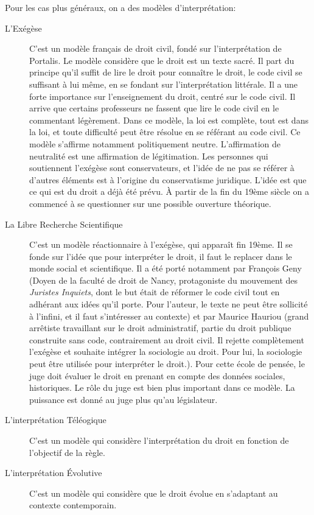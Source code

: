 \documentclass[math]{cours}
\begin{document}
Pour les cas plus généraux, on a des modèles d'interprétation:
\begin{description}
	\item[L'Exégèse] C'est un modèle français de droit civil, fondé sur l'interprétation de Portalis.
		Le modèle considère que le droit est un texte sacré.
		Il part du principe qu'il suffit de lire le droit pour connaître le droit, le code civil se suffisant à lui même, en se fondant sur l'interprétation littérale.
		Il a une forte importance sur l'enseignement du droit, centré sur le code civil.
		Il arrive que certains professeurs ne fassent que lire le code civil en le commentant légèrement.
		Dans ce modèle, la loi est complète, tout est dans la loi, et toute difficulté peut être résolue en se référant au code civil.
		Ce modèle s'affirme notamment politiquement neutre.
		L'affirmation de neutralité est une affirmation de légitimation.
		Les personnes qui soutiennent l'exégèse sont conservateurs, et l'idée de ne pas se référer à d'autres éléments est à l'origine du conservatisme juridique.
		L'idée est que ce qui est du droit a déjà été prévu.
		À partir de la fin du 19ème siècle on a commencé à se questionner sur une possible ouverture théorique.
	\item[La Libre Recherche Scientifique] C'est un modèle réactionnaire à l'exégèse, qui apparaît fin 19ème.
		Il se fonde sur l'idée que pour interpréter le droit, il faut le replacer dans le monde social et scientifique.
		Il a été porté notamment par François Geny (Doyen de la faculté de droit de Nancy, protagoniste du mouvement des \emph{Juristes Inquiets}, dont le but était de réformer le code civil tout en adhérant aux idées qu'il porte.
		Pour l'auteur, le texte ne peut être sollicité à l'infini, et il faut s'intéresser au contexte)
		et par Maurice Hauriou (grand arrêtiste travaillant sur le droit administratif, partie du droit publique construite sans code, contrairement au droit civil.
		Il rejette complètement l'exégèse et souhaite intégrer la sociologie au droit. Pour lui, la sociologie peut être utilisée pour interpréter le droit.).
		Pour cette école de pensée, le juge doit évaluer le droit en prenant en compte des données sociales, historiques.
		Le rôle du juge est bien plus important dans ce modèle.
		La puissance est donné au juge plus qu'au législateur.
	\item[L'interprétation Téléogique] C'est un modèle qui considère l'interprétation du droit en fonction de l'objectif de la règle.
	\item[L'interprétation Évolutive] C'est un modèle qui considère que le droit évolue en s'adaptant au contexte contemporain.
\end{description}
\end{document}
